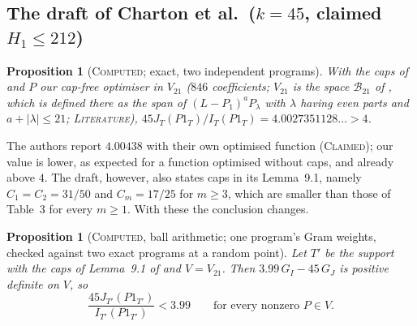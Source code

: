 \documentclass[11pt]{amsart}
\newtheorem{proposition}[theorem]{Proposition}
\theoremstyle{definition}
\theoremstyle{remark}
\newcommand{\lbl}[1]{\textup{\textsc{#1}}}
\begin{document}
\subsection*{The draft of Charton et al.\ ($k=45$, claimed $H_1\le212$)}

\begin{proposition}[\lbl{Computed}; exact, two independent programs]\label{prop:212}
With the caps of \cite[Table~3]{Cha26} and $P$ our cap-free optimiser in
$V_{21}$ ($846$ coefficients; $V_{21}$ is the space $\mathcal B_{21}$ of
\cite[Thm.~11.1]{Cha26}, which is defined there as the span of
$(L-P_1)^aP_\lambda$ with $\lambda$ having even parts and $a+|\lambda|\le21$;
\lbl{Literature}),
$45J_T(P1_T)/I_T(P1_T)=4.0027351128\ldots>4$.
\end{proposition}

The authors report $4.00438$ with their own optimised function (\lbl{Claimed});
our value is lower, as expected for a function optimised without caps, and
already above $4$. The draft, however, also states caps in its Lemma~9.1,
namely $C_1=C_2=31/50$ and $C_m=17/25$ for $m\ge3$, which are smaller than
those of Table~3 for every $m\ge1$. With these the conclusion changes.

\begin{proposition}[\lbl{Computed}, ball arithmetic; one program's Gram weights, checked against two exact programs at a random point]\label{prop:ceiling}
Let $T'$ be the support with the caps of Lemma~9.1 of \cite{Cha26} and
$V=V_{21}$. Then $3.99\,G_I-45\,G_J$ is positive definite on
$V$, so
\[
\frac{45J_{T'}(P1_{T'})}{I_{T'}(P1_{T'})}<3.99\qquad\text{for every nonzero }P\in V.
\]
\end{proposition}
\end{document}
